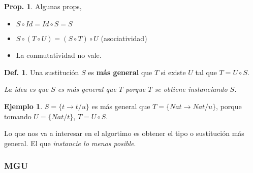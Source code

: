 \documentclass{report}
\theoremstyle{definition} %
\newtheorem{proposition}{Prop.}[chapter]
\newtheorem{definition}{Def.}[chapter]
\newtheorem{example}{Ejemplo}[chapter]
\newcommand{\tfunc}[2]{#1 \to #2}
\newcommand{\sustfor}[2]{#1/#2} %
\newcommand{\comp}[2]{#1 \circ #2}
\begin{document}
\begin{proposition} Algunas props,
    \begin{itemize}
        \item $\comp{S}{Id} = \comp{Id}{S} = S$
        \item $\comp{S}{(\comp{T}{U})} = \comp{(\comp{S}{T})}{U}$
        (asociatividad)
        \item La conmutatividad no vale.
    \end{itemize}
\end{proposition}

\begin{definition}
    Una sustitución $S$ es \textbf{más general} que $T$ si existe $U$ tal que $T
    = \comp{U}{S}$.

    \textit{La idea es que $S$ es más general que $T$ porque $T$ se obtiene instanciando $S$.}

    \begin{example}
        $S = \{ \sustfor{\tfunc{t}{t}}{u} \}$ es más general que
        $T = \{ \sustfor{\tfunc{Nat}{Nat}}{u} \}$, porque tomando
        $U = \{ \sustfor{Nat}{t}\}$, $T = \comp{U}{S}$.
    \end{example}

    Lo que nos va a interesar en el algortimo es obtener el tipo o sustitución
    más general. El que \textit{instancie lo menos posible}.
\end{definition}

\subsubsection{MGU}
\end{document}
